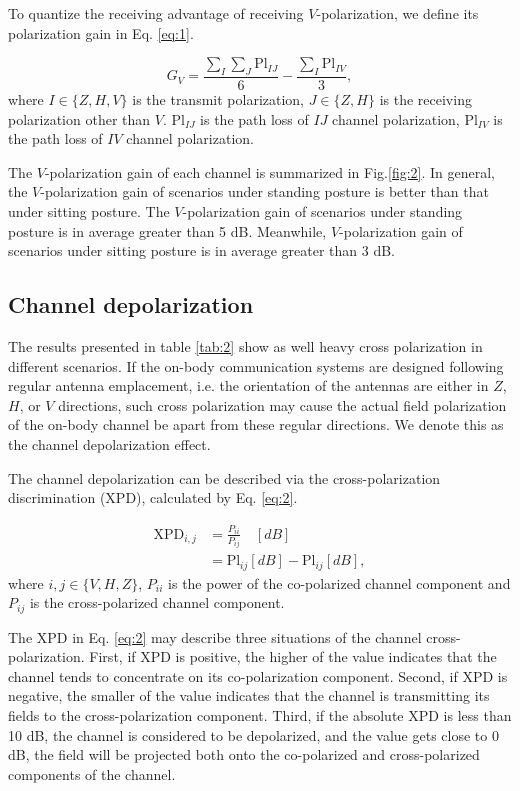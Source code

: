 \documentclass[conference]{IEEEtran}
\begin{document}
To quantize the receiving advantage of receiving $V$-polarization, we define its polarization gain in Eq. \ref{eq:1}.

\begin{equation}
	G_{V}=\frac{\sum\limits_I\sum\limits_J\text{Pl}_{IJ}}{6} -\frac{\sum\limits_I{\text{Pl}_{IV}}}{3},
\label{eq:1}
\end{equation}
where $I\in\{Z,H,V\}$ is the transmit polarization, $J\in\{Z,H\}$ is the receiving polarization other than $V$. $\text{Pl}_{IJ}$ is the path loss of $IJ$ channel polarization, $\text{Pl}_{IV}$ is the path loss of $IV$ channel polarization.

The $V$-polarization gain of each channel is summarized in Fig.\ref{fig:2}. In general, the $V$-polarization gain of scenarios under standing posture is better than that under sitting posture. The $V$-polarization gain of scenarios under standing posture is in average greater than 5 dB. Meanwhile, $V$-polarization gain of scenarios under sitting posture is in average greater than 3 dB.

\subsection{Channel depolarization}
The results presented in table \ref{tab:2} show as well heavy cross polarization in different scenarios. If the on-body communication systems are designed following regular antenna emplacement, i.e. the orientation of the antennas are either in $Z$, $H$, or $V$ directions, such cross polarization may cause the actual field polarization of the on-body channel be apart from these regular directions. We denote this as the channel depolarization effect.

The channel depolarization can be described via the cross-polarization discrimination (XPD), calculated by Eq. \ref{eq:2}.

 \begin{align}
	 \text{XPD}_{i,j}&=\frac{P_{ii}}{P_{ij}} \quad[dB]\nonumber\\
	 &=\text{Pl}_{ij}[dB]-\text{Pl}_{ij}[dB], \label{eq:2}
\end{align}
where $i,j \in \{V,H,Z\}$, $P_{ii}$ is the power of the co-polarized channel component and $P_{ij}$ is the cross-polarized channel component.

The XPD in Eq. \ref{eq:2} may describe three situations of the channel cross-polarization. First, if XPD is positive, the higher of the value indicates that the channel tends to concentrate on its co-polarization component. Second, if XPD is negative, the smaller of the value indicates that the channel is transmitting its fields to the cross-polarization component. Third, if the absolute XPD is less than 10 dB, the channel is considered to be depolarized, and the value gets close to 0 dB, the field will be projected both onto the co-polarized and cross-polarized components of the channel.
\end{document}
